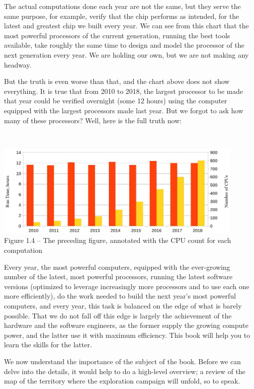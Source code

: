 The actual computations done each year are not the same, but they serve the same purpose, for example, verify that the chip performs as intended, for the latest and greatest chip we built every year. We can see from this chart that the most powerful processors of the current generation, running the best tools available, take roughly the same time to design and model the processor of the next generation every year. We are holding our own, but we are not making any headway.

But the truth is even worse than that, and the chart above does not show everything. It is true that from 2010 to 2018, the largest processor to be made that year could be verified overnight (some 12 hours) using the computer equipped with the largest processors made last year. But we forgot to ask how many of these processors? Well, here is the full truth now:

\hspace*{\fill} \\ %
\begin{center}
\includegraphics[width=0.9\textwidth]{content/1/chapter1/images/4.jpg}\\
Figure 1.4 – The preceding figure, annotated with the CPU count for each computation
\end{center}

Every year, the most powerful computers, equipped with the ever-growing number of the latest, most powerful processors, running the latest software versions (optimized to leverage increasingly more processors and to use each one more efficiently), do the work needed to build the next year's most powerful computers, and every year, this task is balanced on the edge of what is barely possible. That we do not fall off this edge is largely the achievement of the hardware and the software engineers, as the former supply the growing compute power, and the latter use it with maximum efficiency. This book will help you to learn the skills for the latter.

We now understand the importance of the subject of the book. Before we can delve into the details, it would help to do a high-level overview; a review of the map of the territory where the exploration campaign will unfold, so to speak.



















